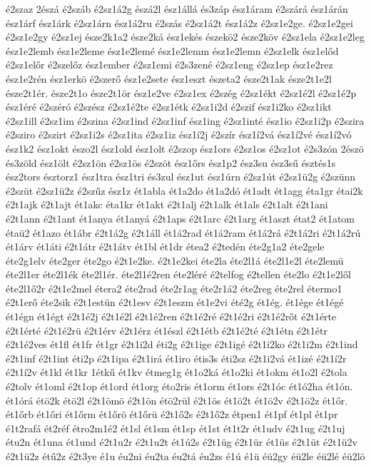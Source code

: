 {é2szaz
2észá
é2száb
é2sz1á2g
észá2l
ész1állá
és3záp
ész1áram
é2szárá
ész1árán
ész1árf
ész1árk
é2sz1árn
ész1á2ru
é2szás
é2sz1á2t
ész1á2z
é2sz1e2ge.
é2sz1e2gei
é2sz1e2gy
é2sz1ej
észe2k1a2
észe2ká
ész1ekés
észekö2
észe2köv
é2sz1ela
é2sz1e2leg
ész1e2lemb
ész1e2leme
ész1e2lemé
ész1e2lemm
ész1e2lemn
é2sz1elk
ész1előd
é2sz1előr
é2szelőz
ész1ember
é2sz1emi
é2s3zené
é2sz1eng
é2sz1ep
ész1e2rez
ész1e2rén
ész1erkö
é2szerő
ész1e2sete
ész1eszt
észeta2
észe2t1ak
észe2t1e2l
észe2t1ér.
észe2t1o
észe2t1ör
ész1e2ve
é2sz1ex
é2szég
é2sz1ékt
é2sz1é2l
é2sz1é2p
ész1éré
é2széró
é2szész
é2sz1é2te
é2sz1étk
é2sz1i2d
é2szif
ész1i2ko
é2sz1ikt
é2sz1ill
é2sz1im
é2szina
é2sz1ind
é2sz1inf
ész1ing
é2sz1inté
ész1io
é2sz1i2p
é2szira
é2sziro
é2szirt
é2sz1i2s
é2sz1ita
é2sz1iz
ész1í2j
é2szír
ész1í2vá
ész1í2vé
ész1í2vó
ész1k2
ész1okt
észo2l
ész1old
ész1olt
é2szop
ész1ors
é2sz1os
é2sz1ot
é2s3zón
2észö
és3zöld
ész1ölt
é2sz1ön
é2sz1ös
é2szöt
ész1őrs
ész1p2
ész3su
ész3sű
észtés1s
ész2tors
észtorz1
ész1tra
ész1tri
és3zul
ész1ut
ész1úrn
é2sz1út
é2sz1ü2g
é2szünn
é2szüt
é2sz1ü2z
é2szűz
ész1z
ét1abla
ét1a2do
ét1a2dó
ét1adt
ét1agg
éta1gr
étai2k
é2t1ajk
é2t1ajt
ét1akc
éta1kr
ét1akt
é2t1alj
é2t1alk
ét1als
é2t1alt
é2t1ani
é2t1ann
é2t1ant
ét1anya
ét1anyá
é2t1aps
é2t1arc
é2t1arg
ét1aszt
état2
ét1atom
étaü2
ét1azo
ét1ábr
é2t1á2g
é2t1áll
ét1á2rad
ét1á2ram
ét1á2rá
é2t1á2ri
é2t1á2rú
ét1árv
ét1áti
é2t1átr
é2t1átv
ét1bl
ét1dr
étea2
é2tedén
éte2g1a2
éte2gele
éte2g1elv
éte2ger
éte2go
é2t1e2ke.
é2t1e2kei
éte2la
éte2l1á
éte2l1e2l
éte2lemü
éte2l1er
éte2l1ék
éte2l1ér.
éte2l1é2ren
éte2léré
é2telfog
é2tellen
éte2lo
é2t1e2lől
éte2l1ő2r
é2t1e2mel
étera2
éte2rad
éte2r1ag
éte2r1á2
éte2reg
éte2rel
étermo1
é2t1erő
éte2sik
é2t1estün
é2t1esv
é2t1eszm
ét1e2vi
été2g
ét1ég.
ét1ége
ét1égé
ét1égn
ét1égt
é2t1é2j
é2t1é2l
é2t1é2ren
é2t1é2ré
é2t1é2ri
é2t1é2rőt
é2t1érte
é2t1érté
é2t1é2rü
é2t1érv
é2t1érz
ét1észl
é2t1étb
é2t1é2té
é2t1étn
é2t1étr
é2t1é2ves
ét1fl
ét1fr
ét1gr
é2t1i2d
éti2g
é2t1ige
é2t1igé
é2t1i2ko
é2t1i2m
é2t1ind
é2t1inf
é2t1int
éti2p
é2t1ipa
é2t1irá
ét1iro
étis3s
éti2sz
é2t1i2vá
ét1izé
é2t1í2r
é2t1í2v
ét1kl
ét1kr
1étkű
ét1kv
étmeg1g
ét1o2ká
ét1o2ki
ét1okm
ét1o2l
é2tola
é2tolv
ét1oml
é2t1op
ét1ord
ét1org
éto2ris
ét1orm
ét1ors
é2t1óc
ét1ó2ha
ét1ón.
ét1órá
étö2k
étö2l
é2t1ömö
é2t1ön
étö2rül
é2t1ös
ét1ö2t
ét1ö2v
é2t1ö2z
ét1őr.
ét1őrb
ét1őri
ét1őrm
ét1őrö
ét1őrü
é2t1ő2s
é2t1ő2z
étpen1
ét1pf
ét1pl
ét1pr
é1t2rafá
ét2réf
étro2m1é2
ét1sl
ét1sm
ét1sp
ét1st
ét1t2r
ét1udv
é2t1ug
é2t1uj
étu2n
ét1una
ét1und
é2t1u2r
é2t1u2t
ét1ú2s
é2t1üg
é2t1ür
ét1üs
é2t1üt
é2t1ü2v
é2t1ü2z
étű2z
é2t3ye
é1u
éu2ni
éu2ta
éu2tá
éu2zs
é1ú
é1ü
éü2gy
éü2le
éü2lé
éü2lö
}
